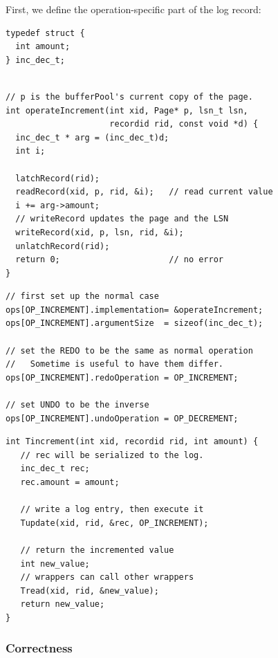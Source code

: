 \documentclass[letterpaper,twocolumn,english]{article}
\begin{document}
First, we define the operation-specific part of the log record:
\begin{small}
\begin{verbatim}
typedef struct {
  int amount;
} inc_dec_t;
\end{verbatim}
\begin{verbatim}

// p is the bufferPool's current copy of the page.
int operateIncrement(int xid, Page* p, lsn_t lsn,
                     recordid rid, const void *d) {
  inc_dec_t * arg = (inc_dec_t)d;
  int i;

  latchRecord(rid); 
  readRecord(xid, p, rid, &i);   // read current value
  i += arg->amount;
  // writeRecord updates the page and the LSN
  writeRecord(xid, p, lsn, rid, &i);
  unlatchRecord(rid); 
  return 0;                      // no error
}
\end{verbatim}
\begin{verbatim}
// first set up the normal case
ops[OP_INCREMENT].implementation= &operateIncrement;
ops[OP_INCREMENT].argumentSize  = sizeof(inc_dec_t);

// set the REDO to be the same as normal operation
//   Sometime is useful to have them differ.
ops[OP_INCREMENT].redoOperation = OP_INCREMENT;

// set UNDO to be the inverse
ops[OP_INCREMENT].undoOperation = OP_DECREMENT;
\end{verbatim}
\begin{verbatim}
int Tincrement(int xid, recordid rid, int amount) {
   // rec will be serialized to the log.
   inc_dec_t rec;
   rec.amount = amount;

   // write a log entry, then execute it
   Tupdate(xid, rid, &rec, OP_INCREMENT);

   // return the incremented value
   int new_value;
   // wrappers can call other wrappers
   Tread(xid, rid, &new_value);
   return new_value;
}
\end{verbatim}
\end{small}


\subsubsection{Correctness}
\end{document}
